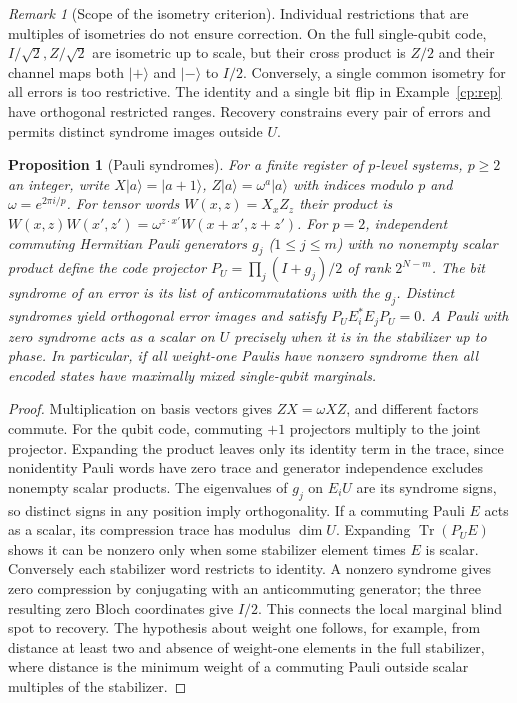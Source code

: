 \documentclass[aps,pra,onecolumn,superscriptaddress,nofootinbib,10pt]{revtex4-2}
\newtheorem{proposition}[theorem]{Proposition}
\theoremstyle{definition}
\theoremstyle{remark}
\newtheorem{remark}[theorem]{Remark}
\begin{document}
\begin{remark}[Scope of the isometry criterion]\label{cp:scaled}
Individual restrictions that are multiples of isometries do not ensure correction. On the full single-qubit code, $I/\sqrt2,Z/\sqrt2$ are isometric up to scale, but their cross product is $Z/2$ and their channel maps both $|+\rangle$ and $|-\rangle$ to $I/2$. Conversely, a single common isometry for all errors is too restrictive. The identity and a single bit flip in Example~\ref{cp:rep} have orthogonal restricted ranges. Recovery constrains every pair of errors and permits distinct syndrome images outside $U$.
\end{remark}

\begin{proposition}[Pauli syndromes]\label{cp:stabilizer}
For a finite register of $p$-level systems, $p\ge2$ an integer, write $X|a\rangle=|a+1\rangle$, $Z|a\rangle=\omega^a|a\rangle$ with indices modulo $p$ and $\omega=e^{2\pi i/p}$. For tensor words $W(x,z)=X_x Z_z$ their product is
$W(x,z)W(x',z')=\omega^{z\cdot x'}W(x+x',z+z')$.
For $p=2$, independent commuting Hermitian Pauli generators $g_j$ ($1\le j\le m$) with no nonempty scalar product define the code projector $P_U=\prod_j(I+g_j)/2$ of rank $2^{N-m}$. The bit syndrome of an error is its list of anticommutations with the $g_j$.
Distinct syndromes yield orthogonal error images and satisfy $P_UE_i^*E_jP_U=0$. A Pauli with zero syndrome acts as a scalar on $U$ precisely when it is in the stabilizer up to phase. In particular, if all weight-one Paulis have nonzero syndrome then all encoded states have maximally mixed single-qubit marginals.
\end{proposition}
\begin{proof}
Multiplication on basis vectors gives $ZX=\omega XZ$, and different factors commute. For the qubit code, commuting $+1$ projectors multiply to the joint projector. Expanding the product leaves only its identity term in the trace, since nonidentity Pauli words have zero trace and generator independence excludes nonempty scalar products. The eigenvalues of $g_j$ on $E_iU$ are its syndrome signs, so distinct signs in any position imply orthogonality. If a commuting Pauli $E$ acts as a scalar, its compression trace has modulus $\dim U$. Expanding $\operatorname{Tr}(P_U E)$ shows it can be nonzero only when some stabilizer element times $E$ is scalar. Conversely each stabilizer word restricts to identity. A nonzero syndrome gives zero compression by conjugating with an anticommuting generator; the three resulting zero Bloch coordinates give $I/2$. This connects the local marginal blind spot to recovery. The hypothesis about weight one follows, for example, from distance at least two and absence of weight-one elements in the full stabilizer, where distance is the minimum weight of a commuting Pauli outside scalar multiples of the stabilizer.
\end{proof}
\end{document}
